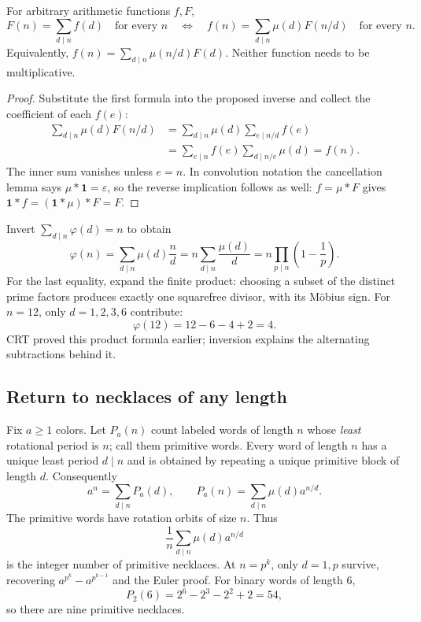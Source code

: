 \begin{theorem}
For arbitrary arithmetic functions $f,F$,
\[
 F(n)=\sum_{d\mid n}f(d)\quad\text{for every }n
 \quad\Longleftrightarrow\quad
 f(n)=\sum_{d\mid n}\mu(d)F(n/d)\quad\text{for every }n.
\]
Equivalently, $f(n)=\sum_{d\mid n}\mu(n/d)F(d)$.
Neither function needs to be multiplicative.
\end{theorem}
\begin{proof}
Substitute the first formula into the proposed inverse and collect
the coefficient of each $f(e)$:
\[
 \begin{aligned}
 \sum_{d\mid n}\mu(d)F(n/d)
 &=\sum_{d\mid n}\mu(d)\sum_{e\mid n/d}f(e)\\
 &=\sum_{e\mid n}f(e)\sum_{d\mid n/e}\mu(d)=f(n).
 \end{aligned}
\]
The inner sum vanishes unless $e=n$. In convolution notation the
cancellation lemma says $\mu*\mathbf{1}=\varepsilon$, so the reverse
implication follows as well:
$f=\mu*F$ gives $\mathbf{1}*f=(\mathbf{1}*\mu)*F=F$.
\end{proof}

\begin{example}
Invert $\sum_{d\mid n}\varphi(d)=n$ to obtain
\[
 \varphi(n)=\sum_{d\mid n}\mu(d)\frac nd
 =n\sum_{d\mid n}\frac{\mu(d)}d
 =n\prod_{p\mid n}\left(1-\frac1p\right).
\]
For the last equality, expand the finite product: choosing a subset
of the distinct prime factors produces exactly one squarefree divisor,
with its M\"obius sign. For $n=12$, only $d=1,2,3,6$ contribute:
\[
 \varphi(12)=12-6-4+2=4.
\]
CRT proved this product formula earlier; inversion explains the
alternating subtractions behind it.
\end{example}

\subsection*{Return to necklaces of any length}
\label{sec:primitive-necklaces}

Fix $a\ge1$ colors. Let $P_a(n)$ count labeled words of length $n$
whose \emph{least} rotational period is $n$; call them primitive words.
Every word of length $n$ has a unique least period $d\mid n$ and
is obtained by repeating a unique primitive block of length $d$.
Consequently
\[
 a^n=\sum_{d\mid n}P_a(d),\qquad
 P_a(n)=\sum_{d\mid n}\mu(d)a^{n/d}.
\]
The primitive words have rotation orbits of size $n$. Thus
\[
 \frac1n\sum_{d\mid n}\mu(d)a^{n/d}
\]
is the integer number of primitive necklaces. At $n=p^k$, only
$d=1,p$ survive, recovering $a^{p^k}-a^{p^{k-1}}$ and the Euler proof.
For binary words of length $6$,
\[
 P_2(6)=2^6-2^3-2^2+2=54,
\]
so there are nine primitive necklaces.

